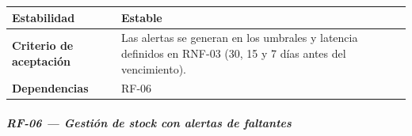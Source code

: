 \documentclass[
]{article}
\begin{document}
{\begin{longtable}[]{|
  >{\raggedright\arraybackslash}p{}|
  >{\raggedright\arraybackslash}p{}|}
\hline
\textbf{Estabilidad} & \begin{minipage}[t]{\linewidth}\raggedright
Estable
\end{minipage} \\
\hline
\textbf{Criterio de aceptación} &
\begin{minipage}[t]{\linewidth}\raggedright
Las alertas se generan en los umbrales y latencia definidos en RNF-03 (30, 15 y 7 días antes del vencimiento).
\end{minipage} \\
\hline
\textbf{Dependencias} & \begin{minipage}[t]{\linewidth}\raggedright
RF-06
\end{minipage} \\
\hline
\end{longtable}
}

\subparagraph{RF-06 --- Gestión de stock con alertas de faltantes}\label{rf-06-gesti-n-de-stock-con-alertas-de-faltante}
\end{document}
